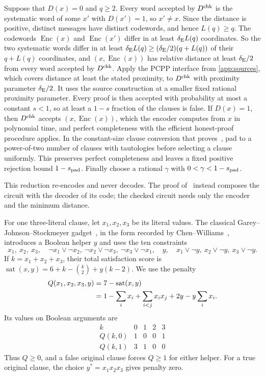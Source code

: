 \documentclass[11pt,letterpaper]{article}
\theoremstyle{definition}
\theoremstyle{remark}
\begin{document}
Suppose that $D(x)=0$ and $q\ge2$. Every word accepted by
$D^{\rm chk}$ is the systematic word of some $x'$ with $D(x')=1$, so
$x'\ne x$. Since the distance is positive, distinct messages have
distinct codewords, and hence $L(q)\ge q$. The codewords
$\operatorname{Enc}(x)$ and $\operatorname{Enc}(x')$ differ in at least
$\delta_{\rm E}L(q)$ coordinates. So the two systematic words differ in
at least $\delta_{\rm E}L(q)\ge(\delta_{\rm E}/2)(q+L(q))$ of their
$q+L(q)$ coordinates, and $(x,\operatorname{Enc}(x))$ has relative
distance at least $\delta_{\rm E}/2$ from every word accepted by
$D^{\rm chk}$. Apply the PCPP interface from \cref{app:sources},
which covers distance at least the stated proximity, to $D^{\rm chk}$
with proximity parameter $\delta_{\rm E}/2$. It uses the source
construction at a smaller fixed rational proximity parameter.
Every proof is then accepted with probability at
most a constant $s<1$, so at least a $1-s$ fraction of the clauses is
false. If $D(x)=1$, then $D^{\rm chk}$ accepts
$(x,\operatorname{Enc}(x))$, which the encoder computes from $x$ in
polynomial time, and perfect completeness with the efficient
honest-proof procedure applies. In the constant-size clause conversion
that proves~\cite[Lemma~24]{CW19}, pad to a power-of-two number of
clauses with tautologies before selecting a clause uniformly. This
preserves perfect completeness and leaves a fixed positive rejection
bound $1-s_{\rm pad}$. Finally choose a rational $\gamma$ with
$0<\gamma<1-s_{\rm pad}$.

This reduction re-encodes and never decodes. The proof
of~\cite[Theorem~5]{CW19} instead composes the circuit with the
decoder of its code; the checked circuit needs only the encoder and
the minimum distance.

For one three-literal clause, let $x_1,x_2,x_3$ be its literal values.
The classical Garey--Johnson--Stockmeyer gadget~\cite{GJS76}, in
the form recorded by Chen--Williams~\cite[Lemma~47]{CW19}, introduces
a Boolean helper $y$ and uses the ten constraints
\[
 x_1,\ x_2,\ x_3,\quad
 \neg x_1\vee\neg x_2,\
 \neg x_2\vee\neg x_3,\
 \neg x_3\vee\neg x_1,\quad
 y,\quad x_1\vee\neg y,\ x_2\vee\neg y,\ x_3\vee\neg y.
\]
If $k=x_1+x_2+x_3$, their total satisfaction score is
$\operatorname{sat}(x,y)=6+k-\binom{k}{2}+y(k-2)$. We use the penalty
\begin{align}
 Q(x_1,x_2,x_3,y)
 &=7-\operatorname{sat}(x,y)\notag\\
 &=1-\sum_i x_i+\sum_{i<j}x_ix_j+2y-y\sum_i x_i.
 \label{eq:gadget-penalty}
\end{align}
Its values on Boolean arguments are
\[
\begin{array}{c|rrrr}
 k&0&1&2&3\\ \hline
 Q(k,0)&1&0&0&1\\
 Q(k,1)&3&1&0&0
\end{array}
\]
Thus $Q\ge0$, and a false original clause forces $Q\ge1$ for
either helper. For a true original clause, the choice
$y^*=x_1x_2x_3$ gives penalty zero.
\end{document}
